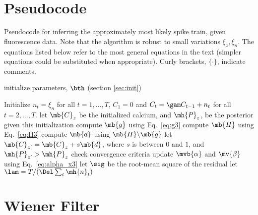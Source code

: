 \newpage
\section{Pseudocode} \label{sec:pseudo}

\begin{algorithm}[h!]
\caption{Pseudocode for inferring the approximately most likely spike train, given fluorescence data. Note that the algorithm is robust to small variations $\xi_z, \xi_n$. The equations listed below refer to the most general equations in the text (simpler equations could be substituted when appropriate).  Curly brackets, $\{ \cdot \}$, indicate comments.}
\label{eqn:pseudocode}
\begin{algorithmic}[1]
\STATE initialize parameters, $\bth$ (section \ref{sec:init})
	
    \STATE Initialize $n_t=\xi_n$ for all $t=1,\ldots, T$, $C_1=0$ and $C_t = \gam C_{t-1} + n_t$ for all $t=2,\ldots, T$.
	\STATE let $\mb{C}_{z}$ be the initialized calcium, and $\mh{P}_{z}$, be the posterior given this initialization
		\STATE compute $\mb{g}$ using Eq.~\eqref{eq:g3}
		\STATE compute $\mb{H}$ using Eq.~\eqref{eq:H3}
		\STATE compute $\mb{d}$ using $\mb{H} \backslash \mb{g}$ 
		\STATE let $\mb{C}_{z'}=\mb{C}_z + s \mb{d}$, where $s$ is between $0$ and $1$, and $\mh{P}_{z'}>\mh{P}_z$ 
	\ENDWHILE
  \ENDFOR
\STATE check convergence criteria
\STATE update $\mvb{\alpha}$ and $\mv{\beta}$ using Eq.~\eqref{eq:alpha_x3}   
\STATE let $\sig$ be the root-mean square of the residual
\STATE let $\lam=T/(\Del\sum_t \mh{n}_t)$
\ENDWHILE
\end{algorithmic}
\end{algorithm}

\clearpage
\section{Wiener Filter} \label{sec:wiener}

